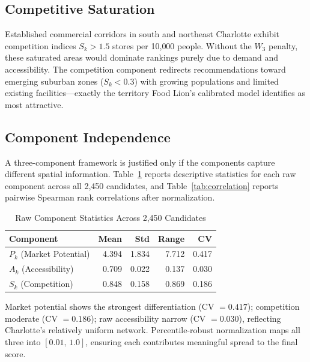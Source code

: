 \documentclass[conference]{IEEEtran}
\begin{document}
\subsection{Competitive Saturation}

Established commercial corridors in south and northeast Charlotte
exhibit competition indices $S_k > 1.5$ stores per 10{,}000 people.
Without the $W_3$ penalty, these saturated areas would dominate
rankings purely due to demand and accessibility. The competition
component redirects recommendations toward emerging suburban zones
($S_k < 0.3$) with growing populations and limited existing
facilities---exactly the territory Food Lion's calibrated model
identifies as most attractive.

\subsection{Component Independence}
\label{sec:component_analysis}

A three-component framework is justified only if the components
capture different spatial information. Table~\ref{tab:component_stats}
reports descriptive statistics for each raw component across all
2{,}450 candidates, and Table~\ref{tab:correlation} reports pairwise
Spearman rank correlations after normalization.

\begin{table}[!t]
\centering
\caption{Raw Component Statistics Across 2,450 Candidates}
\label{tab:component_stats}
\begin{tabular}{lrrrr}
\toprule
\textbf{Component} & \textbf{Mean} & \textbf{Std} & \textbf{Range}
                    & \textbf{CV} \\
\midrule
$P_k$ (Market Potential) & 4.394 & 1.834 & 7.712 & 0.417 \\
$A_k$ (Accessibility)    & 0.709 & 0.022 & 0.137 & 0.030 \\
$S_k$ (Competition)      & 0.848 & 0.158 & 0.869 & 0.186 \\
\bottomrule
\end{tabular}
\end{table}

Market potential shows the strongest differentiation (CV $= 0.417$);
competition moderate (CV $= 0.186$); raw accessibility narrow
(CV $= 0.030$), reflecting Charlotte's relatively uniform network.
Percentile-robust normalization maps all three into $[0.01,\,1.0]$,
ensuring each contributes meaningful spread to the final score.
\end{document}
